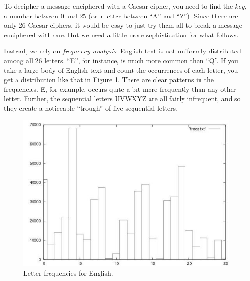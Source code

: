 \documentclass{article}
\begin{document}
\begin{description}
To decipher a message enciphered with a Caesar cipher, you need to
find the {\em key}, a number between 0 and 25 (or a letter between
``A'' and ``Z'').  Since there are only 26 Caesar ciphers, it would be
easy to just try them all to break a message enciphered with one.  But
we need a little more sophistication for what follows.

Instead, we rely on {\em frequency analysis}.  English text is not
uniformly distributed among all 26 letters.  ``E'', for instance, is
much more common than ``Q''.  If you take a large body of English text
and count the occurrences of each letter, you get a distribution like
that in Figure \ref{letterfrequencies}.  There are clear patterns in
the frequencies.  E, for example, occurs quite a bit more frequently
than any other letter.  Further, the sequential letters UVWXYZ are all
fairly infrequent, and so they create a noticeable ``trough'' of five
sequential letters. 

\begin{figure}
  \begin{center}
    \includegraphics[scale=0.5]{freqhist01.png}
  \end{center}
  \caption{Letter frequencies for English.}
  \label{letterfrequencies}
\end{figure}


\end{description}
\end{document}
